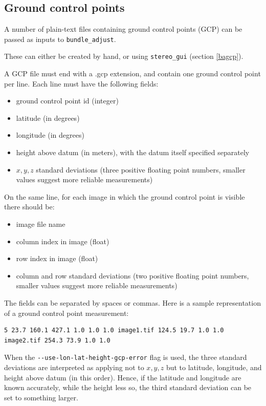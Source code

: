 \subsection{Ground control points}

A number of plain-text files containing ground control points (GCP) can be
passed as inputs to \texttt{bundle\_adjust}.

These can either be created by hand, or using \texttt{stereo\_gui}
(section \ref{bagcp}).

A GCP file must end with a .gcp extension, and contain one ground
control point per line. Each line must have the following fields:
\begin{itemize}
\item ground control point id (integer)
\item latitude (in degrees)
\item longitude (in degrees)
\item height above datum (in meters), with the datum itself specified separately
\item $x, y, z$ standard deviations (three positive floating point
  numbers, smaller values suggest more reliable measurements)
\end{itemize}

On the same line, for each image in which the ground control point is
visible there should be:

\begin{itemize}
\item image file name
\item column index in image (float)
\item row index in image (float)
\item column and row standard deviations (two positive floating point
  numbers, smaller values suggest more reliable measurements)
\end{itemize}

The fields can be separated by spaces or commas. Here is a sample representation
of a ground control point measurement:

\begin{verbatim}
5 23.7 160.1 427.1 1.0 1.0 1.0 image1.tif 124.5 19.7 1.0 1.0 image2.tif 254.3 73.9 1.0 1.0
\end{verbatim}

When the \texttt{-\/-use-lon-lat-height-gcp-error} flag is used, the
three standard deviations are interpreted as applying not to $x, y, z$
but to latitude, longitude, and height above datum (in this
order). Hence, if the latitude and longitude are known accurately, while
the height less so, the third standard deviation can be set to something
larger.

